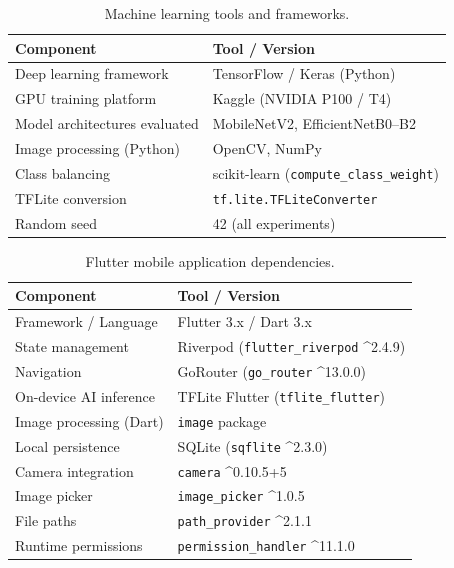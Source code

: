 \begin{table}[H]
\centering
\caption{Machine learning tools and frameworks.}
\label{tab:ml_stack}
\begin{tabular}{|l|l|}
\hline
\textbf{Component} & \textbf{Tool / Version} \\ \hline
Deep learning framework & TensorFlow / Keras (Python) \\ \hline
GPU training platform & Kaggle (NVIDIA P100 / T4) \\ \hline
Model architectures evaluated & MobileNetV2, EfficientNetB0--B2 \\ \hline
Image processing (Python) & OpenCV, NumPy \\ \hline
Class balancing & scikit-learn (\texttt{compute\_class\_weight}) \\ \hline
TFLite conversion & \texttt{tf.lite.TFLiteConverter} \\ \hline
Random seed & 42 (all experiments) \\ \hline
\end{tabular}
\end{table}

\begin{table}[H]
\centering
\caption{Flutter mobile application dependencies.}
\label{tab:flutter_stack}
\begin{tabular}{|l|l|}
\hline
\textbf{Component} & \textbf{Tool / Version} \\ \hline
Framework / Language & Flutter 3.x / Dart 3.x \\ \hline
State management & Riverpod (\texttt{flutter\_riverpod} \^{}2.4.9) \\ \hline
Navigation & GoRouter (\texttt{go\_router} \^{}13.0.0) \\ \hline
On-device AI inference & TFLite Flutter (\texttt{tflite\_flutter}) \\ \hline
Image processing (Dart) & \texttt{image} package \\ \hline
Local persistence & SQLite (\texttt{sqflite} \^{}2.3.0) \\ \hline
Camera integration & \texttt{camera} \^{}0.10.5+5 \\ \hline
Image picker & \texttt{image\_picker} \^{}1.0.5 \\ \hline
File paths & \texttt{path\_provider} \^{}2.1.1 \\ \hline
Runtime permissions & \texttt{permission\_handler} \^{}11.1.0 \\ \hline
\end{tabular}
\end{table}


